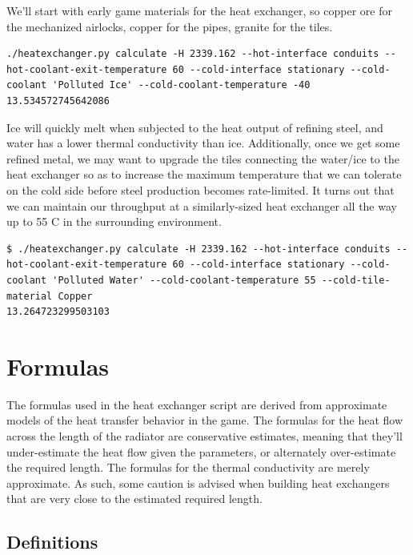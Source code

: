 \documentclass{article}
\numberwithin{equation}{subsection}
\theoremstyle{remark}
\begin{document}
We'll start with early game materials for the heat exchanger, so copper ore for the mechanized airlocks, copper for the pipes, granite for the tiles.

\begin{verbatim}
./heatexchanger.py calculate -H 2339.162 --hot-interface conduits --hot-coolant-exit-temperature 60 --cold-interface stationary --cold-coolant 'Polluted Ice' --cold-coolant-temperature -40
13.534572745642086
\end{verbatim}

Ice will quickly melt when subjected to the heat output of refining steel, and water has a lower thermal conductivity than ice.
Additionally, once we get some refined metal, we may want to upgrade the tiles connecting the water/ice to the heat exchanger so as to increase the maximum temperature that we can tolerate on the cold side before steel production becomes rate-limited.
It turns out that we can maintain our throughput at a similarly-sized heat exchanger all the way up to 55 \degree{}C in the surrounding environment.

\begin{verbatim}
$ ./heatexchanger.py calculate -H 2339.162 --hot-interface conduits --hot-coolant-exit-temperature 60 --cold-interface stationary --cold-coolant 'Polluted Water' --cold-coolant-temperature 55 --cold-tile-material Copper
13.264723299503103
\end{verbatim}

\section{Formulas}

The formulas used in the heat exchanger script are derived from approximate models of the heat transfer behavior in the game.
The formulas for the heat flow across the length of the radiator are conservative estimates, meaning that they'll under-estimate the heat flow given the parameters, or alternately over-estimate the required length.
The formulas for the thermal conductivity are merely approximate.
As such, some caution is advised when building heat exchangers that are very close to the estimated required length.

\subsection{Definitions}
\end{document}

